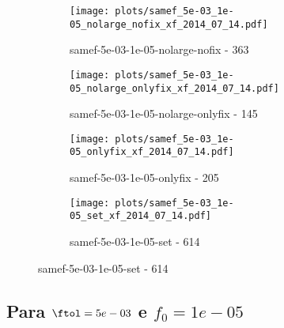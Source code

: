\begin{figure}[H]
  \begin{subfigure}{0.48\textwidth}
    \texttt{[image: plots/samef\_5e-03\_1e-05\_nolarge\_nofix\_xf\_2014\_07\_14.pdf]}
    \caption{samef-5e-03-1e-05-nolarge-nofix - 363}
  \end{subfigure}
  \begin{subfigure}{0.48\textwidth}
    \texttt{[image: plots/samef\_5e-03\_1e-05\_nolarge\_onlyfix\_xf\_2014\_07\_14.pdf]}
    \caption{samef-5e-03-1e-05-nolarge-onlyfix - 145}
  \end{subfigure}
  \begin{subfigure}{0.48\textwidth}
    \texttt{[image: plots/samef\_5e-03\_1e-05\_onlyfix\_xf\_2014\_07\_14.pdf]}
    \caption{samef-5e-03-1e-05-onlyfix - 205}
  \end{subfigure}
  \begin{subfigure}{0.48\textwidth}
    \texttt{[image: plots/samef\_5e-03\_1e-05\_set\_xf\_2014\_07\_14.pdf]}
    \caption{samef-5e-03-1e-05-set - 614}
  \end{subfigure}
\end{figure}

\newpage
\subsection{Para $\ftol = 5e-03$ e $f_0 = 1e-05$}

